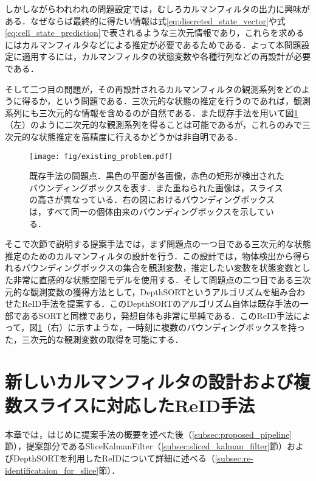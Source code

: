     しかしながらわれわれの問題設定では，むしろカルマンフィルタの出力に興味がある．なぜならば最終的に得たい情報は式\ref{eq:discreted_state_vector}や式\ref{eq:cell_state_prediction}で表されるような三次元情報であり，これらを求めるにはカルマンフィルタなどによる推定が必要であるためである．よって本問題設定に適用するには，カルマンフィルタの状態変数や各種行列などの再設計が必要である．

    そして二つ目の問題が，その再設計されるカルマンフィルタの観測系列をどのように得るか，という問題である．三次元的な状態の推定を行うのであれば，観測系列にも三次元的な情報を含めるのが自然である．また既存手法を用いて図\ref{fig:existing_problem}（左）のように二次元的な観測系列を得ることは可能であるが，これらのみで三次元的な状態推定を高精度に行えるかどうかは非自明である．

    \begin{figure}[t]
        \centering
        \texttt{[image: fig/existing\_problem.pdf]}
        \caption[既存手法の問題点]{既存手法の問題点．黒色の平面が各画像，赤色の矩形が検出されたバウンディングボックスを表す．また重ねられた画像は，スライスの高さが異なっている．右の図におけるバウンディングボックスは，すべて同一の個体由来のバウンディングボックスを示している．}
        \label{fig:existing_problem}
    \end{figure}

    そこで次節で説明する提案手法では，まず問題点の一つ目である三次元的な状態推定のためのカルマンフィルタの設計を行う．この設計では，物体検出から得られるバウンディングボックスの集合を観測変数，推定したい変数を状態変数とした非常に直感的な状態空間モデルを使用する．そして問題点の二つ目である三次元的な観測変数の獲得方法として，DepthSORTというアルゴリズムを組み合わせたReID手法を提案する．このDepthSORTのアルゴリズム自体は既存手法の一部であるSORTと同様であり，発想自体も非常に単純である．このReID手法によって，図\ref{fig:existing_problem}（右）に示すような，一時刻に複数のバウンディングボックスを持った，三次元的な観測変数の取得を可能にする．

\section{新しいカルマンフィルタの設計および複数スライスに対応したReID手法}
\label{sec:proposed_method}

本章では，はじめに提案手法の概要を述べた後（\ref{subsec:proposed_pipeline}節），提案部分であるSliceKalmanFilter（\ref{subsec:sliced_kalman_filter}節）およびDepthSORTを利用したReIDについて詳細に述べる（\ref{subsec:re-identificataion_for_slice}節）．


